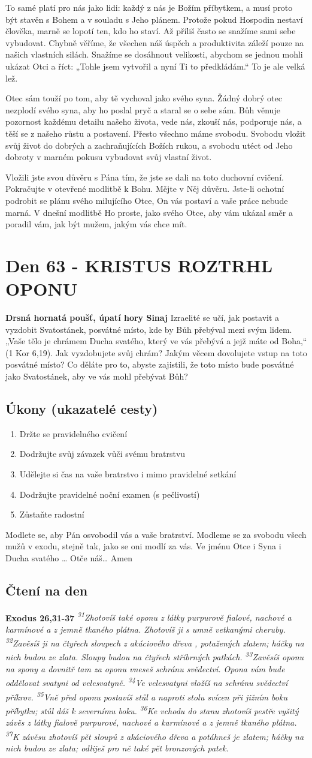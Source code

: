 \documentclass[11pt]{article}
\newcommand{\zacatekDevatyTyden}{
\textbf{Drsná hornatá poušť, úpatí hory Sinaj} \newline 
Izraelité se učí, jak postavit a vyzdobit Svatostánek, posvátné místo, kde by Bůh přebýval mezi svým lidem. „Vaše tělo je chrámem Ducha svatého, který ve vás přebývá a jejž máte od Boha,“ (1 Kor 6,19). Jak vyzdobujete svůj chrám? Jakým věcem dovolujete vstup na toto posvátné místo? Co děláte pro to, abyste zajistili, že toto místo bude posvátné jako Svatostánek, aby ve vás mohl přebývat Bůh?

\subsection*{Úkony (ukazatelé cesty)}
\begin{enumerate}
  \item Držte se pravidelného cvičení
  \item Dodržujte svůj závazek vůči svému bratrstvu
  \item Udělejte si čas na vaše bratrstvo i mimo pravidelné setkání
  \item Dodržujte pravidelné noční examen (s pečlivostí)
  \item Zůstaňte radostní
\end{enumerate}
Modlete se, aby Pán osvobodil vás a vaše bratrství. \newline
Modleme se za svobodu všech mužů v exodu, stejně tak, jako se oni modlí za vás.\newline
Ve jménu Otce i Syna i Ducha svatého …  Otče náš… Amen
}
\begin{document}
To samé platí pro nás jako lidi: každý z nás je Božím příbytkem, a musí proto být stavěn s Bohem a v souladu s Jeho plánem.
Protože pokud Hospodin nestaví člověka, marně se lopotí ten, kdo ho staví. Až příliš často se snažíme sami sebe vybudovat.
Chybně věříme, že všechen náš úspěch a produktivita záleží pouze na našich vlastních silách. Snažíme se dosáhnout velikosti,
abychom se jednou mohli ukázat Otci a říct: „Tohle jsem vytvořil a nyní Ti to předkládám.“ To je ale velká lež.

Otec sám touží po tom, aby tě vychoval jako svého syna. Žádný dobrý otec nezplodí svého syna, aby ho poslal pryč a staral se o
sebe sám. Bůh věnuje pozornost každému detailu našeho života, vede nás, zkouší nás, podporuje nás, a těší se z našeho růstu a
postavení. Přesto všechno máme svobodu. Svobodu vložit svůj život do dobrých a zachraňujících Božích rukou, a svobodu utéct od
Jeho dobroty v marném pokusu vybudovat svůj vlastní život.

Vložili jste svou důvěru s Pána tím, že jste se dali na toto duchovní cvičení. Pokračujte v otevřené modlitbě k Bohu. Mějte v Něj
důvěru. Jste-li ochotní podrobit se plánu svého milujícího Otce, On vás postaví a vaše práce nebude marná. V dnešní modlitbě Ho
proste, jako svého Otce, aby vám ukázal směr a poradil vám, jak být mužem, jakým vás chce mít.


\newpage
\section{Den 63 - KRISTUS ROZTRHL OPONU}
\zacatekDevatyTyden
\subsection*{Čtení na den}
\textbf{Exodus 26,31-37}
\newline
\textit{
\textsuperscript{31}Zhotovíš také oponu z látky purpurově fialové, nachové a karmínové a z jemně tkaného plátna. Zhotovíš ji s umně vetkanými cheruby.
\textsuperscript{32}Zavěsíš ji na čtyřech sloupech z akáciového dřeva , potažených zlatem; háčky na nich budou ze zlata. Sloupy budou na čtyřech stříbrných patkách.
\textsuperscript{33}Zavěsíš oponu na spony a dovnitř tam za oponu vneseš schránu svědectví. Opona vám bude oddělovat svatyni od velesvatyně.
\textsuperscript{34}Ve velesvatyni vložíš na schránu svědectví příkrov.
\textsuperscript{35}Vně před oponu postavíš stůl a naproti stolu svícen při jižním boku příbytku; stůl dáš k severnímu boku.
\textsuperscript{36}Ke vchodu do stanu zhotovíš pestře vyšitý závěs z látky fialově purpurové, nachové a karmínové a z jemně tkaného plátna.
\textsuperscript{37}K závěsu zhotovíš pět sloupů z akáciového dřeva a potáhneš je zlatem; háčky na nich budou ze zlata; odliješ pro ně také pět bronzových patek.
}
\end{document}
